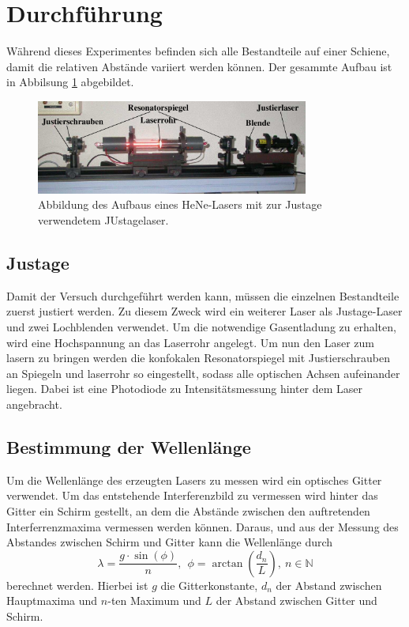 \newpage
\section{Durchführung}
\label{sec:Durchführung}
Während dieses Experimentes befinden sich alle Bestandteile auf einer Schiene,
damit die relativen Abstände variiert werden können. Der gesammte Aufbau ist in
Abbilsung \ref{fig:Versuchsaufbau1} abgebildet.
\begin{figure}[htb]
  \centering
  \includegraphics[width=0.8\textwidth]{content/aufbau.png}
  \caption{Abbildung des Aufbaus eines HeNe-Lasers mit zur Justage verwendetem JUstagelaser.}
  \label{fig:Versuchsaufbau1}
\end{figure}
\FloatBarrier

\subsection{Justage}

Damit der Versuch durchgeführt
werden kann, müssen die einzelnen Bestandteile zuerst justiert werden. Zu diesem
Zweck wird ein weiterer Laser als Justage-Laser und zwei Lochblenden verwendet.
Um die notwendige Gasentladung zu erhalten, wird eine Hochspannung an das Laserrohr
angelegt. Um nun den Laser zum lasern zu bringen werden die konfokalen
Resonatorspiegel mit Justierschrauben  an Spiegeln und laserrohr so eingestellt,
sodass alle optischen Achsen aufeinander liegen. Dabei ist eine Photodiode zu
Intensitätsmessung hinter dem Laser angebracht.

\subsection{Bestimmung der Wellenlänge}
Um die Wellenlänge
des erzeugten Lasers zu messen wird ein optisches Gitter verwendet.
Um das entstehende Interferenzbild zu vermessen wird hinter das Gitter ein Schirm
gestellt, an dem die Abstände zwischen den auftretenden Interferrenzmaxima vermessen
werden können. Daraus, und aus der Messung des Abstandes zwischen Schirm und Gitter
kann die Wellenlänge durch
\begin{equation}
  \lambda = \frac{g\cdot\sin(\phi)}{n},\ \ \phi = \arctan\left(\frac{d_n}{L}\right),\  n\in\mathds{N}
  \label{eqn:welle}
\end{equation}
berechnet werden. Hierbei ist $g$ die Gitterkonstante, $d_n$ der Abstand zwischen Hauptmaxima
und $n$-ten Maximum und $L$ der Abstand zwischen Gitter und Schirm.

